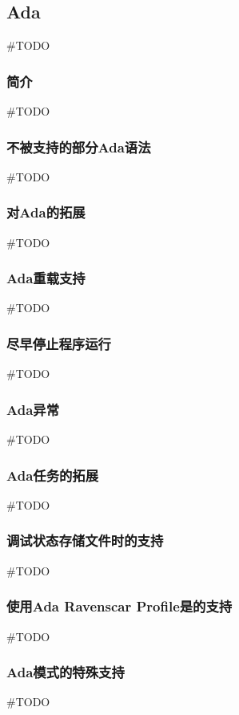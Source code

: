 \subsection{Ada}

\#TODO

\subsubsection{简介}
\#TODO

\subsubsection{不被支持的部分Ada语法}
\#TODO

\subsubsection{对Ada的拓展}
\#TODO

\subsubsection{Ada重载支持}
\#TODO

\subsubsection{尽早停止程序运行}
\#TODO

\subsubsection{Ada异常}
\#TODO

\subsubsection{Ada任务的拓展}
\#TODO

\subsubsection{调试状态存储文件时的支持}
\#TODO

\subsubsection{使用Ada Ravenscar Profile是的支持}
\#TODO

\subsubsection{Ada模式的特殊支持}
\#TODO
